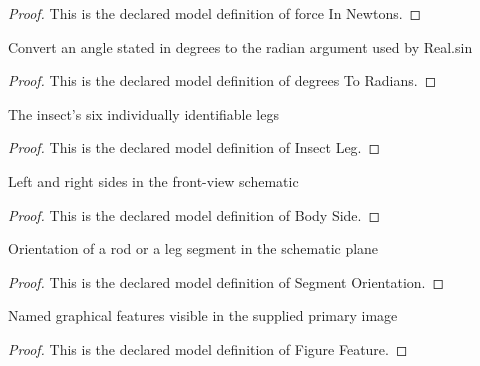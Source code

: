 \begin{proof}
  This is the declared model definition of force In Newtons.
\end{proof}
\begin{definition}
  \label{def:physics:phyx-mini-0758:phyxminiproblems-problemphyxmini0758-degreestoradians}
  Convert an angle stated in degrees to the radian argument used by Real.sin
\end{definition}
\begin{proof}
  This is the declared model definition of degrees To Radians.
\end{proof}
\begin{definition}
  \label{def:physics:phyx-mini-0758:phyxminiproblems-problemphyxmini0758-insectleg}
  The insect's six individually identifiable legs
\end{definition}
\begin{proof}
  This is the declared model definition of Insect Leg.
\end{proof}
\begin{definition}
  \label{def:physics:phyx-mini-0758:phyxminiproblems-problemphyxmini0758-bodyside}
  Left and right sides in the front-view schematic
\end{definition}
\begin{proof}
  This is the declared model definition of Body Side.
\end{proof}
\begin{definition}
  \label{def:physics:phyx-mini-0758:phyxminiproblems-problemphyxmini0758-segmentorientation}
  Orientation of a rod or a leg segment in the schematic plane
\end{definition}
\begin{proof}
  This is the declared model definition of Segment Orientation.
\end{proof}
\begin{definition}
  \label{def:physics:phyx-mini-0758:phyxminiproblems-problemphyxmini0758-figurefeature}
  Named graphical features visible in the supplied primary image
\end{definition}
\begin{proof}
  This is the declared model definition of Figure Feature.
\end{proof}
